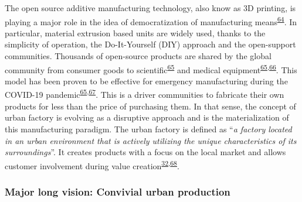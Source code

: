 \documentclass[
  12pt,
  a4paperpaper,
  onecolumn]{article}
\begin{document}
The open source additive manufacturing technology, also know as 3D
printing, is playing a major role in the idea of democratization of
manufacturing
means\textsuperscript{\protect\hyperlink{ref-Beltagui2020}{64}}. In
particular, material extrusion based units are widely used, thanks to
the simplicity of operation, the Do-It-Yourself (DIY) approach and the
open-support communities. Thousands of open-source products are shared
by the global community from consumer goods to
scientific\textsuperscript{\protect\hyperlink{ref-Pearce2020a}{65}} and
medical
equipment\textsuperscript{\protect\hyperlink{ref-Pearce2020a}{65},\protect\hyperlink{ref-He2014}{66}}.
This model has been proven to be effective for emergency manufacturing
during the COVID-19
pandemic\textsuperscript{\protect\hyperlink{ref-Pearce2020a}{65},\protect\hyperlink{ref-tan2021}{67}}.
This is a driver communities to fabricate their own products for less
than the price of purchasing them. In that sense, the concept of urban
factory is evolving as a disruptive approach and is the materialization
of this manufacturing paradigm. The urban factory is defined as
``\emph{a factory located in an urban environment that is actively
utilizing the unique characteristics of its surroundings}''. It creates
products with a focus on the local market and allows customer
involvement during value
creation\textsuperscript{\protect\hyperlink{ref-Herrmann2020}{32},\protect\hyperlink{ref-Ijassi2022}{68}}.

\hypertarget{major-long-vision-convivial-urban-production}{%
\subsubsection{Major long vision: Convivial urban
production}\label{major-long-vision-convivial-urban-production}}
\end{document}
